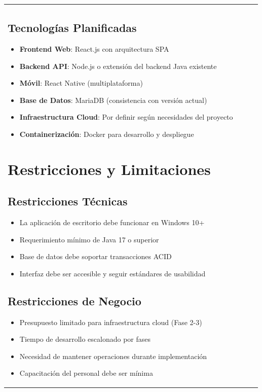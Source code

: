 \documentclass[12pt,letterpaper]{article}
\begin{document}
\begin{longtable}{|p{3cm}|p{2cm}|p{4cm}|p{6cm}|}
\subsection{Tecnologías Planificadas}
\begin{itemize}
    \item \textbf{Frontend Web}: React.js con arquitectura SPA
    \item \textbf{Backend API}: Node.js o extensión del backend Java existente
    \item \textbf{Móvil}: React Native (multiplataforma)
    \item \textbf{Base de Datos}: MariaDB (consistencia con versión actual)
    \item \textbf{Infraestructura Cloud}: Por definir según necesidades del proyecto
    \item \textbf{Containerización}: Docker para desarrollo y despliegue
\end{itemize}

\section{Restricciones y Limitaciones}

\subsection{Restricciones Técnicas}
\begin{itemize}
    \item La aplicación de escritorio debe funcionar en Windows 10+
    \item Requerimiento mínimo de Java 17 o superior
    \item Base de datos debe soportar transacciones ACID
    \item Interfaz debe ser accesible y seguir estándares de usabilidad
\end{itemize}

\subsection{Restricciones de Negocio}
\begin{itemize}
    \item Presupuesto limitado para infraestructura cloud (Fase 2-3)
    \item Tiempo de desarrollo escalonado por fases
    \item Necesidad de mantener operaciones durante implementación
    \item Capacitación del personal debe ser mínima
\end{itemize}


\end{longtable}
\end{document}

